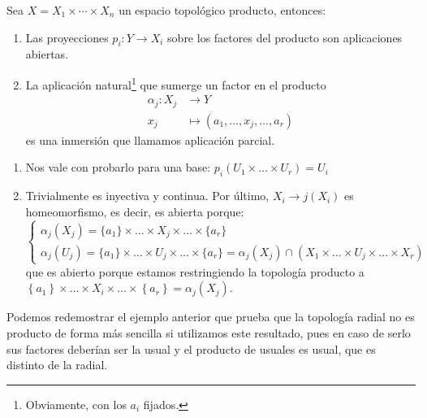 \begin{prop}
Sea $X = X_1 \times \cdots \times X_n$ un espacio topológico producto, entonces: 
\begin{enumerate}
    \item Las proyecciones $p_i: Y \rightarrow X_i$ sobre los factores del producto son aplicaciones abiertas. 
    \item La aplicación natural\footnote{Obviamente, con los $a_i$ fijados.} que sumerge un factor en el producto 
	\begin{align*}
	 \alpha_j : X_j &\longrightarrow Y \\
	 x_j &\longmapsto \left( a_1, \ldots, x_j, \ldots, a_r \right)	
	\end{align*}	    
     es una inmersión que llamamos aplicación parcial.
\end{enumerate}
\end{prop}
\begin{demo}
\begin{enumerate}
    \item Nos vale con probarlo para una base: $p_i\left( U_1 \times \ldots \times U_r \right) = U_i$ 
    \item Trivialmente es inyectiva y continua. Por último, $X_i \rightarrow j\left( X_i \right)$ es homeomorfismo, es decir, es abierta porque:
    \[
    \begin{cases}
        \alpha_j\left( X_j \right) = \{a_1\} \times \ldots \times X_j \times \ldots \times \{a_r\} \\
        \alpha_j\left( U_j \right) = \{a_1\} \times \ldots \times U_j \times \ldots \times \{a_r\} = \alpha_j\left( X_j \right) \cap \left( X_1 \times \ldots \times U_j \times \ldots \times X_r \right) 
    \end{cases}
    \]
    que es abierto porque estamos restringiendo la topología producto a $\left\{ a_1 \right\} \times \ldots \times X_i \times \ldots \times \left\{ a_r \right\} = \alpha_j\left( X_j \right)$.
\end{enumerate}
\end{demo}

\begin{ej}
Podemos redemostrar el ejemplo anterior que prueba que la topología radial no es producto de forma más sencilla si utilizamos este resultado, pues en caso de serlo sus factores deberían ser la usual y el producto de usuales es usual, que es distinto de la radial.
\end{ej}

